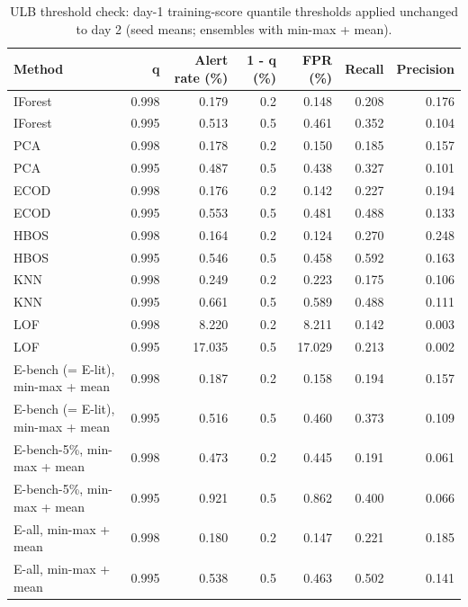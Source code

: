 \begin{table}[t]
\centering
\small
\setlength{\tabcolsep}{4.5pt}
\caption{ULB threshold check: day-1 training-score quantile thresholds applied unchanged to day 2 (seed means; ensembles with min-max + mean).}
\label{tab:e3-ulb-threshold}
\begin{tabular}{lrrrrrr}
\toprule
Method & q & Alert rate (\%) & 1 - q (\%) & FPR (\%) & Recall & Precision \\
\midrule
IForest & 0.998 & 0.179 & 0.2 & 0.148 & 0.208 & 0.176 \\
IForest & 0.995 & 0.513 & 0.5 & 0.461 & 0.352 & 0.104 \\
PCA & 0.998 & 0.178 & 0.2 & 0.150 & 0.185 & 0.157 \\
PCA & 0.995 & 0.487 & 0.5 & 0.438 & 0.327 & 0.101 \\
ECOD & 0.998 & 0.176 & 0.2 & 0.142 & 0.227 & 0.194 \\
ECOD & 0.995 & 0.553 & 0.5 & 0.481 & 0.488 & 0.133 \\
HBOS & 0.998 & 0.164 & 0.2 & 0.124 & 0.270 & 0.248 \\
HBOS & 0.995 & 0.546 & 0.5 & 0.458 & 0.592 & 0.163 \\
KNN & 0.998 & 0.249 & 0.2 & 0.223 & 0.175 & 0.106 \\
KNN & 0.995 & 0.661 & 0.5 & 0.589 & 0.488 & 0.111 \\
LOF & 0.998 & 8.220 & 0.2 & 8.211 & 0.142 & 0.003 \\
LOF & 0.995 & 17.035 & 0.5 & 17.029 & 0.213 & 0.002 \\
E-bench (= E-lit), min-max + mean & 0.998 & 0.187 & 0.2 & 0.158 & 0.194 & 0.157 \\
E-bench (= E-lit), min-max + mean & 0.995 & 0.516 & 0.5 & 0.460 & 0.373 & 0.109 \\
E-bench-5\%, min-max + mean & 0.998 & 0.473 & 0.2 & 0.445 & 0.191 & 0.061 \\
E-bench-5\%, min-max + mean & 0.995 & 0.921 & 0.5 & 0.862 & 0.400 & 0.066 \\
E-all, min-max + mean & 0.998 & 0.180 & 0.2 & 0.147 & 0.221 & 0.185 \\
E-all, min-max + mean & 0.995 & 0.538 & 0.5 & 0.463 & 0.502 & 0.141 \\
\bottomrule
\end{tabular}
\end{table}

